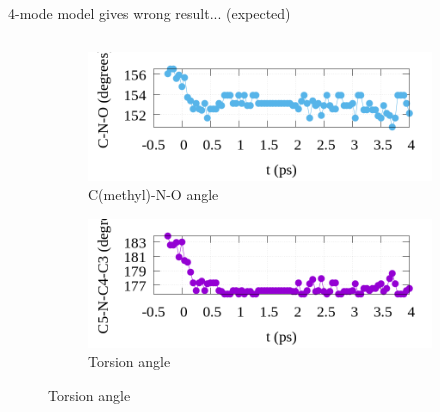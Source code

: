 \documentclass{beamer}
\begin{document}
\begin{frame}{4-mode model gives wrong result... (expected)}
\begin{columns}
\begin{column}{0.5\textwidth}
\begin{figure}
	\begin{subfigure}[b]{\textwidth}
		\centering
		\includegraphics[width=\textwidth]{figures/argmin_angle_vstrongmodes_50000.png}
		\caption{C(methyl)-N-O angle}
	\end{subfigure}
	\begin{subfigure}[b]{\textwidth}
		\centering
		\includegraphics[width=\textwidth]{figures/argmin_torsion_vstrongmodes_50000.png}
		\caption{Torsion angle}
	\end{subfigure}
\end{figure}
\end{column}


\end{columns}
\end{frame}
\end{document}
